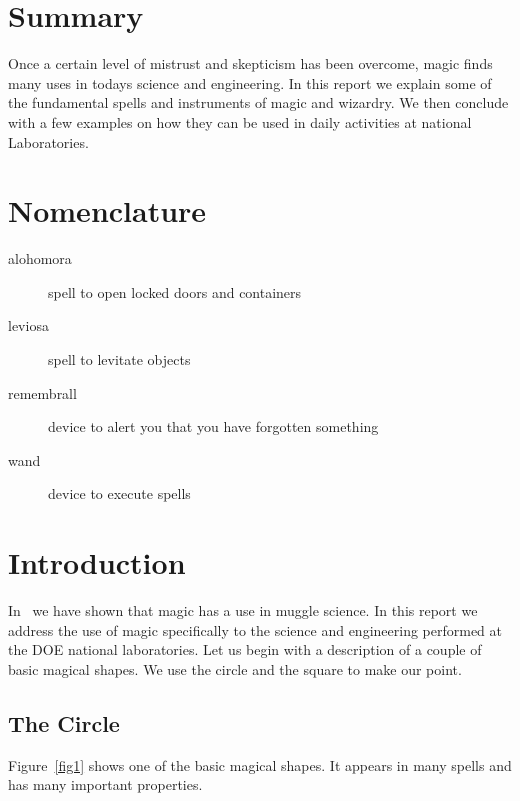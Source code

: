 \documentclass[pdf,ps2pdf,12pt,strict,OUO]{SANDreport}
\begin{document}
    \clearpage
    \section*{Summary}
	Once a certain level of mistrust and skepticism has
	been overcome, magic finds many uses in todays science
	and engineering. In this report we explain some of the
	fundamental spells and instruments of magic and wizardry. We
	then conclude with a few examples on how they can be used
	in daily activities at national Laboratories.


    \clearpage
    \section*{Nomenclature}
    \begin{description}
	\item[alohomora]
	    spell to open locked doors and containers
	\item[leviosa]
	    spell to levitate objects
	\item[remembrall]
	    device to alert you that you have forgotten something
	\item[wand]
	    device to execute spells
    \end{description}


    \SANDmain		%

    \section{Introduction}
	\label{Intro}
	In~\cite{Potter} we have shown that magic has a use in
	muggle science. In this report we address the use of magic
	specifically to the science and engineering performed at the
	DOE national laboratories. Let us begin with a description
	of a couple of basic magical shapes. We use the circle and
	the square to make our point.

	\subsection{The Circle}
	    Figure~\ref{fig1} shows one of the basic magical shapes. It
	    appears in many spells and has many important properties.
\end{document}
